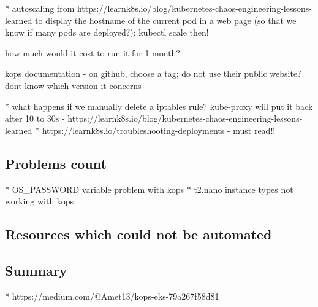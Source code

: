 * autoscaling from https://learnk8s.io/blog/kubernetes-chaos-engineering-lessons-learned to display the hostname of the current pod in a web page (so that we know if many pods are deployed?); kubectl scale then!




how much would it cost to run it for 1 month?

kops documentation - on github, choose a tag; do not use their public website? dont know which version it concerns


* what happens if we manually delete a iptables rule? kube-proxy will put it back after 10 to 30s - https://learnk8s.io/blog/kubernetes-chaos-engineering-lessons-learned
* https://learnk8s.io/troubleshooting-deployments - must read!!

\subsection{Problems count}
* OS_PASSWORD variable problem with kops
* t2.nano instance types not working with kops

\subsection{Resources which could not be automated}
\subsection{Summary}
* https://medium.com/@Amet13/kops-eks-79a267f58d81
